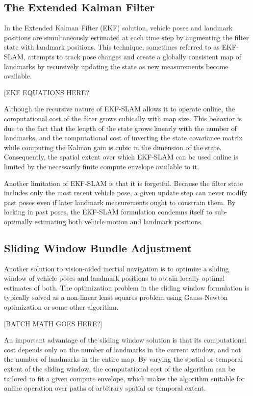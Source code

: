 \documentclass[letterpaper, 10 pt, conference]{ieeeconf}  %
\begin{document}
\subsection{The Extended Kalman Filter} \label{subsec:ekf}
In the Extended Kalman Filter (EKF) solution, vehicle poses and landmark positions are simultaneously estimated at each time step by augmenting the filter state with landmark positions.
This technique, sometimes referred to as EKF-SLAM, attempts to track pose changes and create a globally consistent map of landmarks by recursively updating the state as new measurements become available.

[EKF EQUATIONS HERE?]

Although the recursive nature of EKF-SLAM allows it to operate online, the computational cost of the filter grows cubically with map size.
This behavior is due to the fact that the length of the state grows linearly with the number of landmarks, and the computational cost of inverting the state covariance matrix while computing the Kalman gain is cubic in the dimension of the state.
Consequently, the spatial extent over which EKF-SLAM can be used online is limited by the necessarily finite compute envelope available to it.

Another limitation of EKF-SLAM is that it is forgetful.
Because the filter state includes only the most recent vehicle pose, a given update step can never modify past poses even if later landmark measurements ought to constrain them.
By locking in past poses, the EKF-SLAM formulation condemns itself to sub-optimally estimating both vehicle motion and landmark positions.

\subsection{Sliding Window Bundle Adjustment} \label{subsec:slidingwindow}
Another solution to vision-aided inertial navigation is to optimize a sliding window of vehicle poses and landmark positions to obtain locally optimal estimates of both.
The optimization problem in the sliding window formulation is typically solved as a non-linear least squares problem using Gauss-Newton optimization or some other algorithm.

[BATCH MATH GOES HERE?]

An important advantage of the sliding window solution is that its computational cost depends only on the number of landmarks in the current window, and not the number of landmarks in the entire map.
By varying the spatial or temporal extent of the sliding window, the computational cost of the algorithm can be tailored to fit a given compute envelope, which makes the algorithm suitable for online operation over paths of arbitrary spatial or temporal extent.
\end{document}
